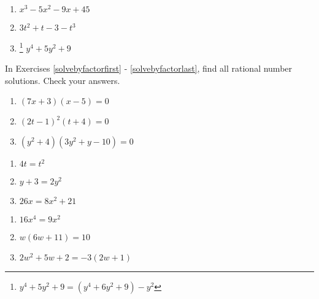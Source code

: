 \documentclass{ximera}
\begin{document}
\begin{multicols}{3}
\begin{enumerate}
\setcounter{enumi}{\value{HW}}

\item $x^3 - 5x^2 - 9x + 45$
\item $3t^2 + t - 3 - t^3$
\item\hspace{-0.1in}\footnote{$y^4 + 5y^2 + 9 = (y^4 + 6y^2 + 9) - y^2$} $y^4 + 5y^2 + 9$\label{factoringexlast}


\setcounter{HW}{\value{enumi}}
\end{enumerate}
\end{multicols}

In Exercises \ref{solvebyfactorfirst} - \ref{solvebyfactorlast},  find all rational number solutions.  Check your answers.

\begin{multicols}{3}
\begin{enumerate}
\setcounter{enumi}{\value{HW}}

\item   $(7x+3)(x-5) = 0$ \label{solvebyfactorfirst}
\item   $(2t-1)^2 (t+4) = 0$
\item   $(y^2 + 4)(3y^2 +y - 10) = 0$

\setcounter{HW}{\value{enumi}}
\end{enumerate}
\end{multicols}


\begin{multicols}{3}
\begin{enumerate}
\setcounter{enumi}{\value{HW}}

\item   $4t = t^2$
\item   $y+3 = 2y^2$
\item   $26x = 8x^2 + 21$  

\setcounter{HW}{\value{enumi}}
\end{enumerate}
\end{multicols}


\begin{multicols}{3}
\begin{enumerate}
\setcounter{enumi}{\value{HW}}

\item $16x^4 = 9x^2$
\item $w(6w+11) = 10$
\item $2w^2 + 5w + 2 = - 3(2w+1)$

\setcounter{HW}{\value{enumi}}
\end{enumerate}
\end{multicols}
\end{document}
